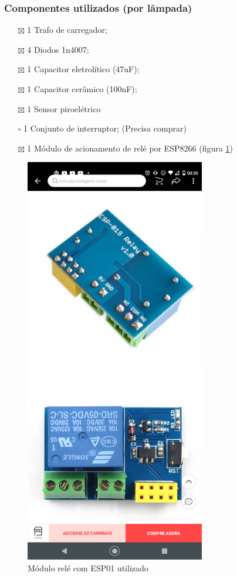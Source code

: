 \documentclass[11pt]{article}
\begin{document}
\subsubsection{Componentes utilizados (por lâmpada)}
\label{sec:org9c9887f}
\begin{itemize}
\item[{$\boxtimes$}] 1 Trafo de carregador;
\item[{$\boxtimes$}] 4 Diodos 1n4007;
\item[{$\boxtimes$}] 1 Capacitor eletrolítico (47uF);
\item[{$\boxtimes$}] 1 Capacitor cerâmico (100nF);
\item[{$\boxtimes$}] 1 Sensor piroelétrico
\item[{$\square$}] 1 Conjunto de interruptor; (Precisa comprar)
\item[{$\boxtimes$}] 1 Módulo de acionamento de relé por ESP8266 (figura \ref{fig:module_esp01})
\end{itemize}
\begin{figure}[h!]
\caption{\label{fig:module_esp01}Módulo relé com ESP01 utilizado}
\centering
\includegraphics[width=0.7\textwidth]{./module_esp01.png}
\end{figure}
\end{document}
